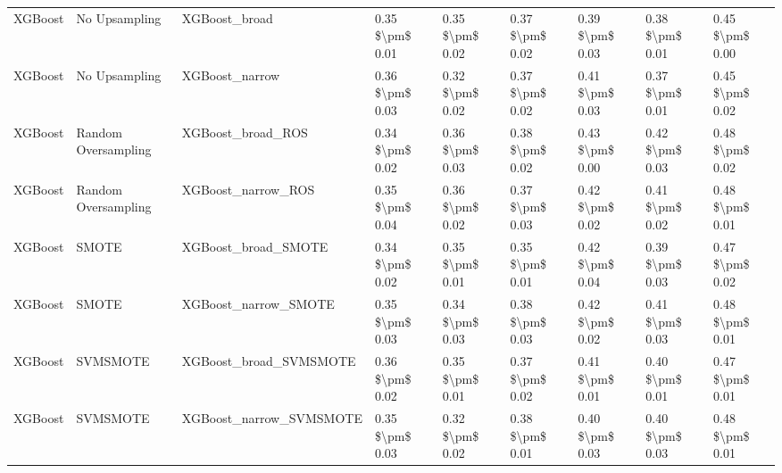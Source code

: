 \begin{tabular}{lllllllll}
                        XGBoost &                 No Upsampling &                                XGBoost\_broad & 0.35 \$\textbackslash pm\$ 0.01 &           0.35 \$\textbackslash pm\$ 0.02 &       0.37 \$\textbackslash pm\$ 0.02 &        0.39 \$\textbackslash pm\$ 0.03 &                         0.38 \$\textbackslash pm\$ 0.01 &     0.45 \$\textbackslash pm\$ 0.00 \\
                        XGBoost &                 No Upsampling &                               XGBoost\_narrow & 0.36 \$\textbackslash pm\$ 0.03 &           0.32 \$\textbackslash pm\$ 0.02 &       0.37 \$\textbackslash pm\$ 0.02 &        0.41 \$\textbackslash pm\$ 0.03 &                         0.37 \$\textbackslash pm\$ 0.01 &     0.45 \$\textbackslash pm\$ 0.02 \\
                        XGBoost &           Random Oversampling &                            XGBoost\_broad\_ROS & 0.34 \$\textbackslash pm\$ 0.02 &           0.36 \$\textbackslash pm\$ 0.03 &       0.38 \$\textbackslash pm\$ 0.02 &        0.43 \$\textbackslash pm\$ 0.00 &                         0.42 \$\textbackslash pm\$ 0.03 &     0.48 \$\textbackslash pm\$ 0.02 \\
                        XGBoost &           Random Oversampling &                           XGBoost\_narrow\_ROS & 0.35 \$\textbackslash pm\$ 0.04 &           0.36 \$\textbackslash pm\$ 0.02 &       0.37 \$\textbackslash pm\$ 0.03 &        0.42 \$\textbackslash pm\$ 0.02 &                         0.41 \$\textbackslash pm\$ 0.02 &     0.48 \$\textbackslash pm\$ 0.01 \\
                        XGBoost &                         SMOTE &                          XGBoost\_broad\_SMOTE & 0.34 \$\textbackslash pm\$ 0.02 &           0.35 \$\textbackslash pm\$ 0.01 &       0.35 \$\textbackslash pm\$ 0.01 &        0.42 \$\textbackslash pm\$ 0.04 &                         0.39 \$\textbackslash pm\$ 0.03 &     0.47 \$\textbackslash pm\$ 0.02 \\
                        XGBoost &                         SMOTE &                         XGBoost\_narrow\_SMOTE & 0.35 \$\textbackslash pm\$ 0.03 &           0.34 \$\textbackslash pm\$ 0.03 &       0.38 \$\textbackslash pm\$ 0.03 &        0.42 \$\textbackslash pm\$ 0.02 &                         0.41 \$\textbackslash pm\$ 0.03 &     0.48 \$\textbackslash pm\$ 0.01 \\
                        XGBoost &                      SVMSMOTE &                       XGBoost\_broad\_SVMSMOTE & 0.36 \$\textbackslash pm\$ 0.02 &           0.35 \$\textbackslash pm\$ 0.01 &       0.37 \$\textbackslash pm\$ 0.02 &        0.41 \$\textbackslash pm\$ 0.01 &                         0.40 \$\textbackslash pm\$ 0.01 &     0.47 \$\textbackslash pm\$ 0.01 \\
                        XGBoost &                      SVMSMOTE &                      XGBoost\_narrow\_SVMSMOTE & 0.35 \$\textbackslash pm\$ 0.03 &           0.32 \$\textbackslash pm\$ 0.02 &       0.38 \$\textbackslash pm\$ 0.01 &        0.40 \$\textbackslash pm\$ 0.03 &                         0.40 \$\textbackslash pm\$ 0.03 &     0.48 \$\textbackslash pm\$ 0.01 \\
\bottomrule
\end{tabular}
